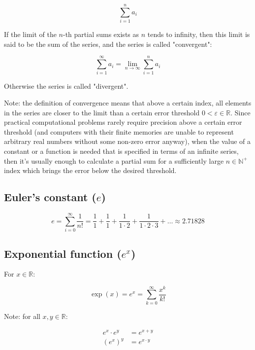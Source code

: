 \documentclass[titlepage]{article}
\begin{document}
        $$\sum_{i=1}^n a_i$$

        If the limit of the $n$-th partial sums exists as $n$ tends to infinity,
        then this limit is said to be the sum of the series, and the series is
        called "convergent":

        $$\sum_{i=1}^\infty a_i = \lim_{n \to \infty} \sum_{i=1}^n a_i$$

        Otherwise the series is called "divergent".

        Note: the definition of convergence means that above a certain index,
        all elements in the series are closer to the limit than a certain
        error threshold $0 < \varepsilon \in \mathbb{R}$. Since practical
        computational problems rarely require precision above a certain error
        threshold (and computers with their finite memories are unable to
        represent arbitrary real numbers without some non-zero error anyway),
        when the value of a constant or a function is needed that is specified
        in terms of an infinite series, then it's usually enough to calculate a
        partial sum for a sufficiently large $n \in \mathbb{N}^+$ index which
        brings the error below the desired threshold.

      \subsection{Euler's constant ($e$)}

        $$
          e = \sum_{i=0}^\infty \frac{1}{n!}
            = \frac{1}{1}
              + \frac{1}{1}
              + \frac{1}{1 \cdot 2}
              + \frac{1}{1 \cdot 2 \cdot 3}
              + \ldots
            \approx 2.71828
        $$

      \subsection{Exponential function ($e^x$)}

        For $x \in \mathbb{R}$:

        $$\exp(x) = e^x = \sum_{k=0}^\infty \frac{x^k}{k!}$$

        Note: for all $x, y \in \mathbb{R}$:

        \begin{align*}
          e^x \cdot e^y & = e^{x+y} \\
          \left( e^x \right)^y & = e^{x \cdot y}
        \end{align*}
\end{document}
